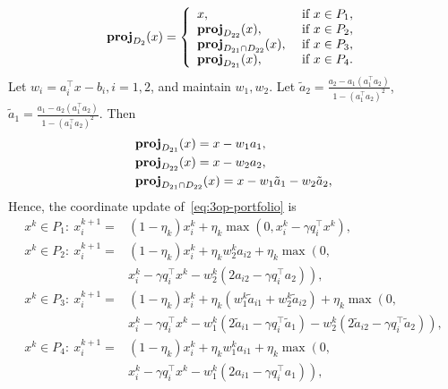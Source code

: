 $$\prj_{D_2}(x)=\left\{
\begin{array}{ll}
x, & \text{ if }x\in P_1,\\
\prj_{D_{22}}(x), &\text{ if }x\in P_2,\\
\prj_{D_{21}\cap D_{22}}(x), & \text{ if }x\in P_3,\\
\prj_{D_{21}}(x), & \text{ if }x\in P_4.
\end{array}
\right.$$ 
Let $w_i=a_i^\top x-b_i, i=1,2$, and maintain $w_1,w_2$. Let $\tilde{a}_2=\frac{a_2-a_1(a_1^\top a_2)}{1-(a_1^\top a_2)^2}$, $\tilde{a}_1=\frac{a_1-a_2(a_1^\top a_2)}{1-(a_1^\top a_2)^2}$. Then 
\begin{align*}
&\prj_{D_{21}}(x)=x-w_1a_1,\\
&\prj_{D_{22}}(x)=x-w_2a_2,\\
&\prj_{D_{21}\cap D_{22}}(x)=x-w_1 \tilde{a}_1-w_2\tilde{a}_2,
\end{align*}
%
%
Hence, the coordinate update of~\eqref{eq:3op-portfolio} is
\begin{subequations}\label{eq:3op-portfolio2}
\begin{align}
x^k\in P_1:\ x_i^{k+1}= & \textstyle (1-\eta_k)x_i^k+\eta_k\max(0, x_i^k-\gamma q_i^\top x^k),\\
x^k\in P_2:\  x_i^{k+1}= & \textstyle (1-\eta_k)x_i^k+\eta_kw_2^ka_{i2}+\eta_k\max\left(0, \right.\nonumber\\
&\textstyle \left.x_i^k-\gamma q_i^\top x^k-w_2^k(2a_{i2}-\gamma q_i^\top a_2)\right),\\
x^k\in P_3:\ x_i^{k+1}= &\textstyle  (1-\eta_k)x_i^k+\eta_k\left(w_1^k \tilde{a}_{i1}+w_2^k\tilde{a}_{i2}\right)+\eta_k\max\left(0,\right.\nonumber\\
&\textstyle \left.x_i^k-\gamma q_i^\top x^k-w_1^k (2\tilde{a}_{i1}-\gamma q_i^\top \tilde{a}_1)-{w}_2^k(2\tilde{a}_{i2}-\gamma q_i^\top \tilde{a}_2)\right),\\
x^k\in P_4:\ x_i^{k+1}= &\textstyle  (1-\eta_k)x_i^k+\eta_k w_1^ka_{i1}+\eta_k\max\left(0, \right.\nonumber\\
&\textstyle \left.x_i^k-\gamma q_i^\top x^k-w_1^k(2a_{i1}-\gamma q_i^\top a_1)\right),
\end{align}
\end{subequations}
